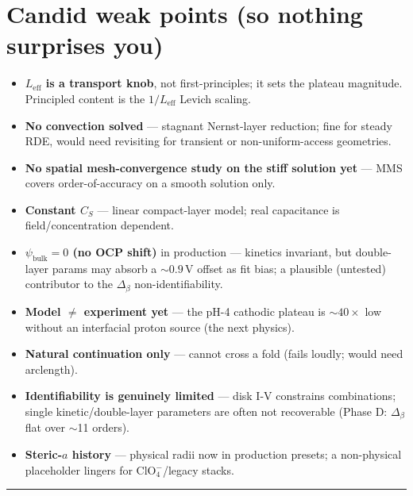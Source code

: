 \documentclass[11pt]{article}
\newcommand{\CS}{C_{S}}
\newcommand{\Leff}{L_{\mathrm{eff}}}
\newcommand{\bulk}{\mathrm{bulk}}
\begin{document}
\section{Candid weak points (so nothing surprises you)}\label{sec:weak}
\begin{itemize}
\item \textbf{$\Leff$ is a transport knob}, not first-principles; it sets the
plateau magnitude. Principled content is the $1/\Leff$ Levich scaling.
\item \textbf{No convection solved} --- stagnant Nernst-layer reduction; fine
for steady RDE, would need revisiting for transient or non-uniform-access
geometries.
\item \textbf{No spatial mesh-convergence study on the stiff solution yet} ---
MMS covers order-of-accuracy on a smooth solution only.
\item \textbf{Constant $\CS$} --- linear compact-layer model; real capacitance
is field/concentration dependent.
\item \textbf{$\psi_{\bulk}=0$ (no OCP shift)} in production --- kinetics
invariant, but double-layer params may absorb a $\sim0.9$\,V offset as fit
bias; a plausible (untested) contributor to the $\Delta_\beta$
non-identifiability.
\item \textbf{Model $\neq$ experiment yet} --- the pH-4 cathodic plateau is
$\sim40\times$ low without an interfacial proton source (the next physics).
\item \textbf{Natural continuation only} --- cannot cross a fold (fails
loudly; would need arclength).
\item \textbf{Identifiability is genuinely limited} --- disk I-V constrains
combinations; single kinetic/double-layer parameters are often not
recoverable (Phase D: $\Delta_\beta$ flat over $\sim$11 orders).
\item \textbf{Steric-$a$ history} --- physical radii now in production presets;
a non-physical placeholder lingers for ClO$_4^-$/legacy stacks.
\end{itemize}

\medskip\hrule
\end{document}
